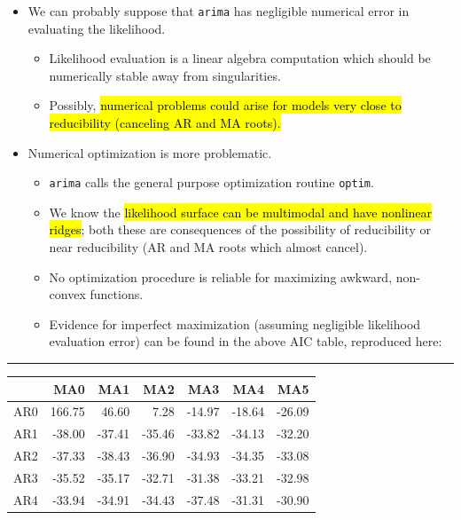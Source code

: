\documentclass[]{article}
\begin{document}
\begin{itemize}
\item
  We can probably suppose that \texttt{arima} has negligible numerical
  error in evaluating the likelihood.

  \begin{itemize}
  \item
    Likelihood evaluation is a linear algebra computation which should
    be numerically stable away from singularities.
  \item
    Possibly, \hl{numerical problems could arise for models very close to
    reducibility (canceling AR and MA roots).}
  \end{itemize}
\item
  Numerical optimization is more problematic.

  \begin{itemize}
  \item
    \texttt{arima} calls the general purpose optimization routine
    \texttt{optim}.
  \item
    We know the \hl{likelihood surface can be multimodal and have nonlinear
    ridges}; both these are consequences of the possibility of
    reducibility or near reducibility (AR and MA roots which almost
    cancel).
  \item
    No optimization procedure is reliable for maximizing awkward,
    non-convex functions.
  \item
    Evidence for imperfect maximization (assuming negligible likelihood
    evaluation error) can be found in the above AIC table, reproduced
    here:
  \end{itemize}
\end{itemize}

\begin{center}\rule{0.5\linewidth}{\linethickness}\end{center}

\begin{longtable}[]{@{}lrrrrrr@{}}
\toprule
& MA0 & MA1 & MA2 & MA3 & MA4 & MA5\tabularnewline
\midrule
\endhead
 AR0 & 166.75 & 46.60 & 7.28 & -14.97 & -18.64 & -26.09\tabularnewline
 AR1 & -38.00 & -37.41 & -35.46 & -33.82 & -34.13 &
-32.20\tabularnewline
 AR2 & -37.33 & -38.43 & -36.90 & -34.93 & -34.35 &
-33.08\tabularnewline
 AR3 & -35.52 & -35.17 & -32.71 & -31.38 & -33.21 &
-32.98\tabularnewline
 AR4 & -33.94 & -34.91 & -34.43 & -37.48 & -31.31 &
-30.90\tabularnewline
\bottomrule
\end{longtable}
\end{document}
